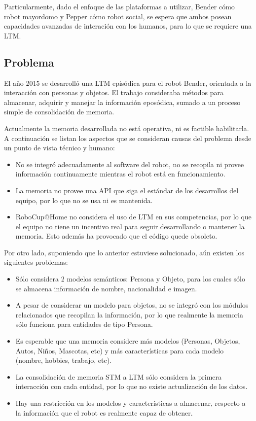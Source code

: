 Particularmente, dado el enfoque de las plataformas a utilizar, Bender c\'omo robot mayordomo y Pepper c\'omo robot social, se espera que ambos posean capacidades avanzadas de interaci\'on con los humanos, para lo que se requiere una LTM.


\subsection{Problema}

El a\~no 2015 se desarroll\'o una LTM epis\'odica para el robot Bender, orientada a la interacci\'on con personas y objetos\cite{Sanchez:2015}. El trabajo consideraba m\'etodos para almacenar, adquirir y manejar la informaci\'on epos\'odica, sumado a un proceso simple de consolidaci\'on de memoria.

Actualmente la memoria desarrollada no est\'a operativa, ni es factible habilitarla. A continuaci\'on se listan los aspectos que se consideran causas del problema desde un punto de vista t\'ecnico y humano:
\begin{itemize}
\item No se integr\'o adecuadamente al software del robot, no se recopila ni provee informaci\'on continuamente mientras el robot est\'a en funcionamiento.
\item La memoria no provee una API que siga el est\'andar de los desarrollos del equipo, por lo que no se usa ni es mantenida.
\item RoboCup@Home no considera el uso de LTM en sus competencias, por lo que el equipo no tiene un incentivo real para seguir desarrollando o mantener la memoria. Esto adem\'as ha provocado que el c\'odigo quede obsoleto.
\end{itemize}

Por otro lado, suponiendo que lo anterior estuviese solucionado, a\'un existen los siguientes problemas:
\begin{itemize}
\item S\'olo considera 2 modelos sem\'anticos: Persona y Objeto, para los cuales s\'olo se almacena informaci\'on de nombre, nacionalidad e imagen.
\item A pesar de considerar un modelo para objetos, no se integr\'o con los m\'odulos relacionados que recopilan la informaci\'on, por lo que realmente la memoria s\'olo funciona para entidades de tipo Persona.
\item Es esperable que una memoria considere m\'as modelos (Personas, Objetos, Autos, Ni\~nos, Mascotas, etc) y m\'as caracter\'isticas para cada modelo (nombre, hobbies, trabajo, etc).
\item La consolidaci\'on de memoria STM a LTM s\'olo considera la primera interacci\'on con cada entidad, por lo que no existe actualizaci\'on de los datos.
\item Hay una restricci\'on en los modelos y caracter\'isticas a almacenar, respecto a la informaci\'on que el robot es realmente capaz de obtener.
\end{itemize}



